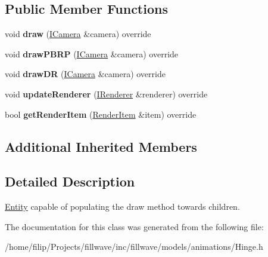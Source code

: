 \subsection*{Public Member Functions}
\begin{DoxyCompactItemize}
\item 
void {\bfseries draw} (\hyperlink{classflw_1_1flf_1_1ICamera}{I\+Camera} \&camera) override\hypertarget{classflw_1_1flf_1_1Hinge_a7eaaa5d2d2a1e2f3c6c6500031d0cab6}{}\label{classflw_1_1flf_1_1Hinge_a7eaaa5d2d2a1e2f3c6c6500031d0cab6}

\item 
void {\bfseries draw\+P\+B\+RP} (\hyperlink{classflw_1_1flf_1_1ICamera}{I\+Camera} \&camera) override\hypertarget{classflw_1_1flf_1_1Hinge_ac9aed70e3fbed2d4e2bb40b1248f2955}{}\label{classflw_1_1flf_1_1Hinge_ac9aed70e3fbed2d4e2bb40b1248f2955}

\item 
void {\bfseries draw\+DR} (\hyperlink{classflw_1_1flf_1_1ICamera}{I\+Camera} \&camera) override\hypertarget{classflw_1_1flf_1_1Hinge_a4e7c9e2e2cd5a3f9a5fbd1d9b24c13c0}{}\label{classflw_1_1flf_1_1Hinge_a4e7c9e2e2cd5a3f9a5fbd1d9b24c13c0}

\item 
void {\bfseries update\+Renderer} (\hyperlink{classflw_1_1flf_1_1IRenderer}{I\+Renderer} \&renderer) override\hypertarget{classflw_1_1flf_1_1Hinge_a6c71b26eba2726415d89f281de5be6d1}{}\label{classflw_1_1flf_1_1Hinge_a6c71b26eba2726415d89f281de5be6d1}

\item 
bool {\bfseries get\+Render\+Item} (\hyperlink{structflw_1_1flf_1_1RenderItem}{Render\+Item} \&item) override\hypertarget{classflw_1_1flf_1_1Hinge_a6cc851b6a7ce956c6a16ec4fe1f30585}{}\label{classflw_1_1flf_1_1Hinge_a6cc851b6a7ce956c6a16ec4fe1f30585}

\end{DoxyCompactItemize}
\subsection*{Additional Inherited Members}


\subsection{Detailed Description}
\hyperlink{classflw_1_1flf_1_1Entity}{Entity} capable of populating the draw method towards children. 

The documentation for this class was generated from the following file\+:\begin{DoxyCompactItemize}
\item 
/home/filip/\+Projects/fillwave/inc/fillwave/models/animations/Hinge.\+h\end{DoxyCompactItemize}
